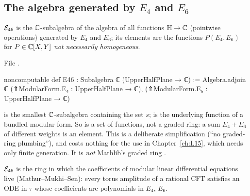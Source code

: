 \subsection{The algebra generated by \texorpdfstring{$E_4$}{E4} and \texorpdfstring{$E_6$}{E6}}

\begin{definition}[$\lfourteenE$]\label{l14:def:E46}
$\lfourteenE$ is the ${\mathbb{C}}$-subalgebra of the algebra of all functions $\mathbb{H}\to{\mathbb{C}}$ (pointwise operations) generated
by $E_4$ and $E_6$; its elements are the functions $P(E_4,E_6)$ for $P\in{\mathbb{C}}[X,Y]$ \emph{not necessarily homogeneous}.
\end{definition}
\noindent File .
\begin{leancode}
noncomputable def E46 : Subalgebra ℂ (UpperHalfPlane → ℂ) :=
  Algebra.adjoin ℂ {(⇑ModularForm.E₄ : UpperHalfPlane → ℂ), (⇑ModularForm.E₆ : UpperHalfPlane → ℂ)}
\end{leancode}
\begin{dictionary}
 is the smallest ${\mathbb{C}}$-subalgebra containing the set $s$;  is the underlying function of a
bundled modular form. So  is a set of functions, not a graded ring: a sum $E_4 + E_6$ of different weights is an
element. This is a deliberate simplification (``no graded-ring plumbing''), and costs nothing for the use in
Chapter~\ref{ch:L15}, which needs only finite generation. It is \emph{not} Mathlib's graded ring .
\end{dictionary}
\begin{physics}
$\lfourteenE$ is the ring in which the coefficients of modular linear differential equations live (Mathur--Mukhi--Sen): every
torus amplitude of a rational CFT satisfies an ODE in $\tau$ whose coefficients are polynomials in $E_4$, $E_6$.
\end{physics}

